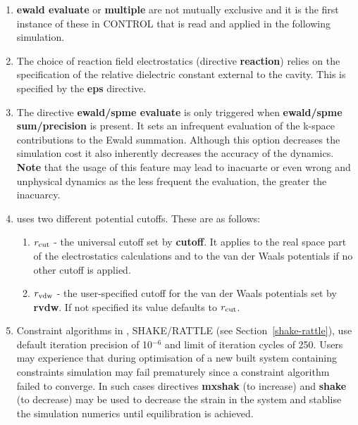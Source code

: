 \begin{enumerate}
\item {\bf ewald evaluate} or {\bf multiple} are not mutually
exclusive and it is the first instance of these in CONTROL that
is read and applied in the following simulation.

\item The choice of reaction field electrostatics
(directive {\bf reaction}) relies on the specification of the
relative dielectric constant external to the cavity.  This is
specified by the {\bf eps} directive.

\item The directive {\bf ewald/spme evaluate} is only triggered
when {\bf ewald/spme sum/precision} is present.  It sets an infrequent
evaluation of the k-space contributions to the Ewald summation.
Although this option decreases the simulation cost it also inherently
decreases the accuracy of the dynamics.  {\bf Note} that the usage of
this feature may lead to inacuarte or even wrong and unphysical
dynamics as the less frequent the evaluation, the greater the inacuarcy.

\item \D uses two different potential cutoffs.  These are as
follows:
\begin{enumerate}
\item  $r_{\rm cut}$ - the universal cutoff set by {\bf cutoff}.
It applies to the real space part of the electrostatics calculations
and to the van der Waals potentials if
no other cutoff is applied.
\item $r_{\rm vdw}$ - the user-specified cutoff for the van
der Waals potentials set by {\bf rvdw}.  If not specified its value
defaults to $r_{\rm cut}$.
\end{enumerate}

\item Constraint algorithms in \D, SHAKE/RATTLE (see Section~\ref{shake-rattle}),
use default iteration precision of 10$^{-6}$ and limit of iteration
cycles of 250.  Users may experience that during optimisation of a
new built system containing constraints simulation may fail
prematurely since a constraint algorithm failed to converge.
In such cases directives {\bf mxshak} (to increase) and {\bf shake}
(to decrease) may be used to decrease the strain in the system
and stablise the simulation numerics until equilibration is achieved.


\end{enumerate}
